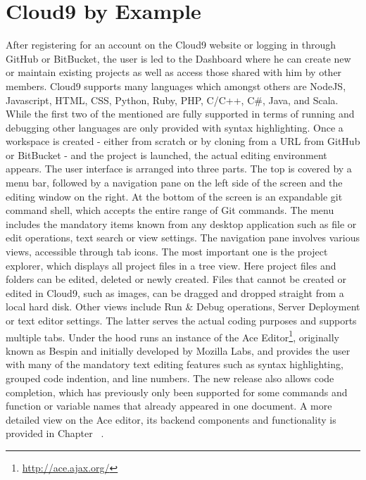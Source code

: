 \section{Cloud9 by Example}
\label{sec:Motivation}


After registering for an account on the Cloud9 website or logging in through GitHub or BitBucket,
the user is led to the Dashboard where he can create new or maintain existing projects as well as access those
shared with him by other members.
Cloud9 supports many languages which amongst others are NodeJS, Javascript, HTML, CSS, Python, Ruby, PHP, C/C++, C\#, Java, and Scala.
While the first two of the mentioned are fully supported in terms of running and debugging other languages are only provided with syntax highlighting.
Once a workspace is created - either from scratch or by cloning from a URL from GitHub or BitBucket -
and the project is launched, the actual editing environment appears.
The user interface is arranged into three parts. The top is covered by a menu bar, followed by a navigation pane on the left side of the screen and the editing window on the right.
At the bottom of the screen is an expandable git command shell, which accepts the entire range of Git commands.
The menu includes the mandatory items known from any desktop application such as file or edit operations, text search or view settings.
The navigation pane involves various views, accessible through tab icons. The most important one is the project explorer,
which displays all project files in a tree view. Here project files and folders can be edited, deleted or newly created.
Files that cannot be created or edited in Cloud9, such as images, can be dragged and dropped straight from a local hard disk.
Other views include Run \& Debug operations, Server Deployment or text editor settings.
The latter serves the actual coding purposes and supports multiple tabs. Under the hood runs an instance of the Ace
Editor\footnote{\url{http://ace.ajax.org/}}, originally known as Bespin and initially developed by Mozilla Labs,
and provides the user with many of the mandatory text editing features such as syntax highlighting, grouped code indention, and line numbers.
The new release also allows code completion, which has previously only been supported for some commands and
function or variable names that already appeared in one document.
A more detailed view on the Ace editor, its backend components and functionality is provided in Chapter ~\needcite. 


